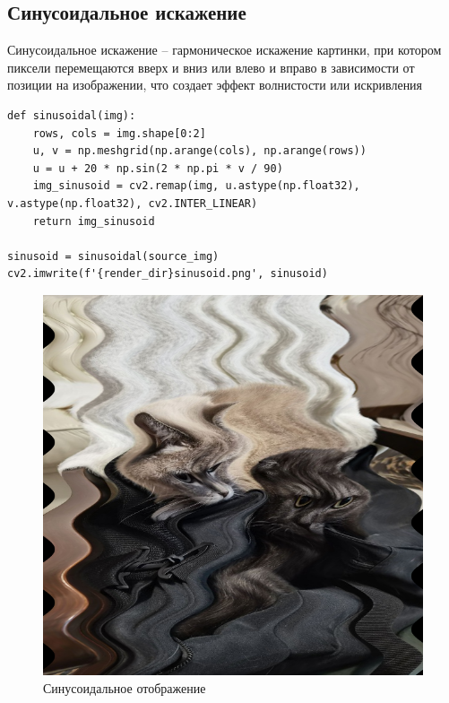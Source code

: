 \documentclass[a4paper, 16pt]{article}
\begin{document}
\subsection{Синусоидальное искажение}
\noindent Синусоидальное искажение -- гармоническое искажение картинки,
при котором пиксели перемещаются вверх и вниз или влево и вправо в зависимости
от позиции на изображении, что создает эффект волнистости или искривления


\begin{lstlisting}[label=sinusoidal-code,caption=Код для синусоидального искажения]
def sinusoidal(img):
    rows, cols = img.shape[0:2]
    u, v = np.meshgrid(np.arange(cols), np.arange(rows))
    u = u + 20 * np.sin(2 * np.pi * v / 90)
    img_sinusoid = cv2.remap(img, u.astype(np.float32), v.astype(np.float32), cv2.INTER_LINEAR)
    return img_sinusoid

sinusoid = sinusoidal(source_img)
cv2.imwrite(f'{render_dir}sinusoid.png', sinusoid)
\end{lstlisting}


\begin{figure}[!htb]
    \centering
    \includegraphics[scale=0.3]{sinusoid.png}
    \captionsetup{skip=0pt}
    \caption{Синусоидальное отображение}
    \label{Рис:15}
\end{figure}
\end{document}
